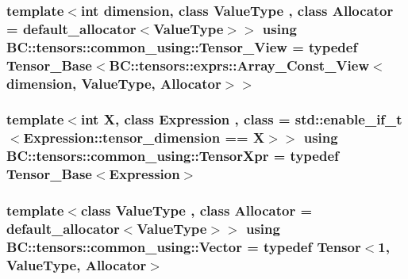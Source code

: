 \subsubsection[{\texorpdfstring{Tensor\+\_\+\+View}{Tensor_View}}]{\setlength{\rightskip}{0pt plus 5cm}template$<$int dimension, class Value\+Type , class Allocator  = default\+\_\+allocator$<$\+Value\+Type$>$$>$ using {\bf B\+C\+::tensors\+::common\+\_\+using\+::\+Tensor\+\_\+\+View} = typedef {\bf Tensor\+\_\+\+Base}$<${\bf B\+C\+::tensors\+::exprs\+::\+Array\+\_\+\+Const\+\_\+\+View}$<$dimension, Value\+Type, {\bf Allocator}$>$$>$}\hypertarget{namespaceBC_1_1tensors_1_1common__using_aa7ad21a0b7b01eeedea2f0eccb4ed15f}{}\label{namespaceBC_1_1tensors_1_1common__using_aa7ad21a0b7b01eeedea2f0eccb4ed15f}
\subsubsection[{\texorpdfstring{Tensor\+Xpr}{TensorXpr}}]{\setlength{\rightskip}{0pt plus 5cm}template$<$int X, class Expression , class  = std\+::enable\+\_\+if\+\_\+t$<$\+Expression\+::tensor\+\_\+dimension == X$>$$>$ using {\bf B\+C\+::tensors\+::common\+\_\+using\+::\+Tensor\+Xpr} = typedef {\bf Tensor\+\_\+\+Base}$<$Expression$>$}\hypertarget{namespaceBC_1_1tensors_1_1common__using_a435d2e2b94686b268ba1c3049f6afa68}{}\label{namespaceBC_1_1tensors_1_1common__using_a435d2e2b94686b268ba1c3049f6afa68}
\subsubsection[{\texorpdfstring{Vector}{Vector}}]{\setlength{\rightskip}{0pt plus 5cm}template$<$class Value\+Type , class Allocator  = default\+\_\+allocator$<$\+Value\+Type$>$$>$ using {\bf B\+C\+::tensors\+::common\+\_\+using\+::\+Vector} = typedef {\bf Tensor}$<$1, Value\+Type, {\bf Allocator}$>$}\hypertarget{namespaceBC_1_1tensors_1_1common__using_ab2d6784064c0dda8aef3c2a9177ffa77}{}\label{namespaceBC_1_1tensors_1_1common__using_ab2d6784064c0dda8aef3c2a9177ffa77}
